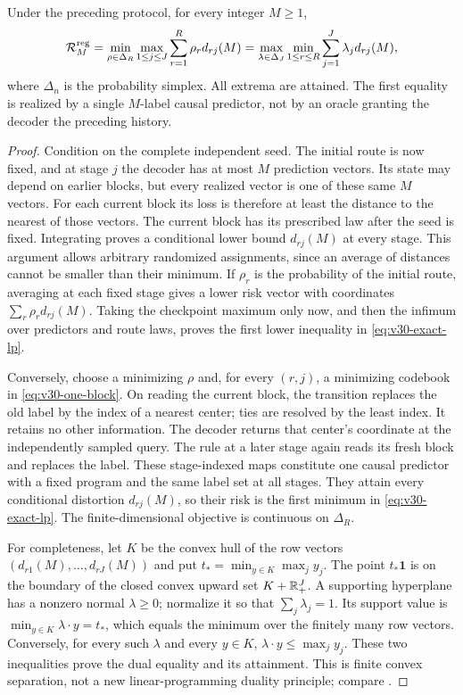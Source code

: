 \begin{theorem}
\label{thm:v30-regenerative}
Under the preceding protocol, for every integer $M\ge1$,
\begin{equation}\label{eq:v30-exact-lp}
 \mathcal R_M^{\rm reg}
 =\min_{\rho\in\Delta_R}\max_{1\le j\le J}
                  \sum_{r=1}^R\rho_r d_{rj}(M)
 =\max_{\lambda\in\Delta_J}\min_{1\le r\le R}
                  \sum_{j=1}^J\lambda_j d_{rj}(M),
\end{equation}
where $\Delta_n$ is the probability simplex. All extrema are attained.
The first equality is realized by a single $M$-label causal predictor,
not by an oracle granting the decoder the preceding history.
\end{theorem}
\begin{proof}
Condition on the complete independent seed. The initial route is now
fixed, and at stage $j$ the decoder has at most $M$ prediction vectors.
Its state may depend on earlier blocks, but every realized vector is
one of these same $M$ vectors. For each current block its loss is
therefore at least the distance to the nearest of those vectors.
The current block has its prescribed law after the seed is fixed.
Integrating proves a conditional lower bound $d_{rj}(M)$ at every
stage. This argument allows arbitrary randomized assignments, since
an average of distances cannot be smaller than their minimum.
If $\rho_r$ is the probability of the initial route, averaging at each
fixed stage gives a lower risk vector with coordinates
$\sum_r\rho_r d_{rj}(M)$. Taking the checkpoint maximum only now,
and then the infimum over predictors and route laws, proves the first
lower inequality in \eqref{eq:v30-exact-lp}.

Conversely, choose a minimizing $\rho$ and, for every $(r,j)$, a
minimizing codebook in \eqref{eq:v30-one-block}. On reading the current
block, the transition replaces the old label by the index of a nearest
center; ties are resolved by the least index. It retains no other
information. The decoder returns that center's coordinate at the
independently sampled query. The rule at a later stage again reads its
fresh block and replaces the label. These stage-indexed maps constitute
one causal predictor with a fixed program and the same label set at
all stages. They attain every conditional distortion $d_{rj}(M)$,
so their risk is the first minimum in \eqref{eq:v30-exact-lp}.
The finite-dimensional objective is continuous on $\Delta_R$.

For completeness, let $K$ be the convex hull of the row vectors
$(d_{r1}(M),\ldots,d_{rJ}(M))$ and put
$t_* = \min_{y\in K}\max_j y_j$. The point $t_*\mathbf1$ is on
the boundary of the closed convex upward set $K+\mathbb R_+^J$. A supporting
hyperplane has a nonzero normal $\lambda\ge0$; normalize it so that
$\sum_j\lambda_j=1$. Its support value is
$\min_{y\in K}\lambda\cdot y=t_*$, which equals the minimum over
the finitely many row vectors. Conversely, for every such $\lambda$
and every $y\in K$, $\lambda\cdot y\le\max_jy_j$.
These two inequalities prove the dual equality and its attainment.
This is finite convex separation, not a new linear-programming duality
principle; compare \cite{Rockafellar1964}.
\end{proof}

